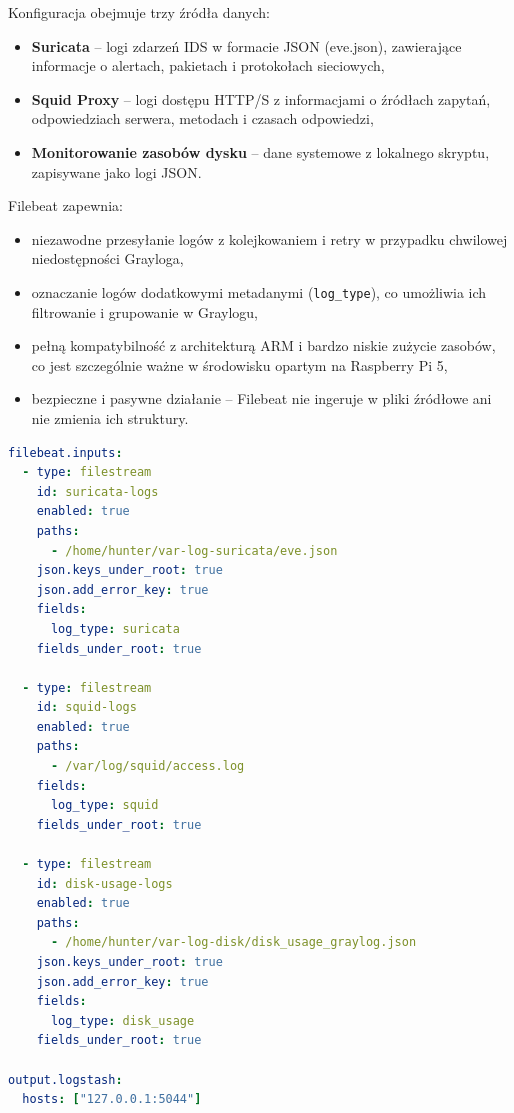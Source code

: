 \documentclass[
    left=2.5cm,         %
    right=2.5cm,        %
    top=2.5cm,          %
    bottom=3cm,         %
    bindingoffset=6mm,  %
    nohyphenation=true %
]{eiti/eiti-thesis} %
\begin{document}
Konfiguracja obejmuje trzy źródła danych:
\begin{itemize}
    \item \textbf{Suricata} – logi zdarzeń IDS w formacie JSON (eve.json), zawierające informacje o alertach, pakietach i protokołach sieciowych,
    \item \textbf{Squid Proxy} – logi dostępu HTTP/S z informacjami o źródłach zapytań, odpowiedziach serwera, metodach i czasach odpowiedzi,
    \item \textbf{Monitorowanie zasobów dysku} – dane systemowe z lokalnego skryptu, zapisywane jako logi JSON.
\end{itemize}

Filebeat zapewnia:
\begin{itemize}
    \item niezawodne przesyłanie logów z kolejkowaniem i retry w przypadku chwilowej niedostępności Grayloga,
    \item oznaczanie logów dodatkowymi metadanymi (\texttt{log\_type}), co umożliwia ich filtrowanie i grupowanie w Graylogu,
    \item pełną kompatybilność z architekturą ARM i bardzo niskie zużycie zasobów, co jest szczególnie ważne w środowisku opartym na Raspberry Pi 5,
    \item bezpieczne i pasywne działanie – Filebeat nie ingeruje w pliki źródłowe ani nie zmienia ich struktury.
\end{itemize}

\newpage
\begin{lstlisting}[language=yaml, caption={Przykładowa konfiguracja Filebeat (filebeat.yml)}, label={lst:filebeat-config}]
filebeat.inputs:
  - type: filestream
    id: suricata-logs
    enabled: true
    paths:
      - /home/hunter/var-log-suricata/eve.json
    json.keys_under_root: true
    json.add_error_key: true
    fields:
      log_type: suricata
    fields_under_root: true

  - type: filestream
    id: squid-logs
    enabled: true
    paths:
      - /var/log/squid/access.log
    fields:
      log_type: squid
    fields_under_root: true

  - type: filestream
    id: disk-usage-logs
    enabled: true
    paths:
      - /home/hunter/var-log-disk/disk_usage_graylog.json
    json.keys_under_root: true
    json.add_error_key: true
    fields:
      log_type: disk_usage
    fields_under_root: true

output.logstash:
  hosts: ["127.0.0.1:5044"]
\end{lstlisting}
\end{document}
